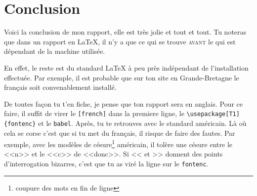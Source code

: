 \chapter{Conclusion}
\label{Conclusion}

Voici la conclusion de mon rapport, elle est tr\`es jolie et tout et tout. Tu noteras que dans un rapport en \LaTeX{}, il n'y a que ce qui se trouve \textsc{avant} le \verb"" qui est d\'ependant de la machine utilis\'ee.

En effet, le reste est du standard \LaTeX{} \`a peu pr\`es ind\'ependant de l'installation effectu\'ee. Par exemple, il est probable que sur ton site en
Grande-Bretagne le fran\c{c}ais soit convenablement install\'e.

De toutes fa\c{c}on tu t'en fiche, je pense que ton rapport sera en anglais. Pour ce faire, il suffit de virer le \verb"[french]" dans la premiere ligne,
le \verb"\usepackage[T1]{fontenc}" et le \verb"babel". Apr\`es, tu te retrouves avec le standard am\'ericain. L\`a o\`u cela se corse c'est que si tu met du
fran\c{c}ais, il risque de faire des fautes. Par exemple, avec les mod\`eles de c\'esure\footnote{coupure des mots en fin de ligne} am\'ericain, il tol\`ere
une c\'esure entre le <<n>> et le <<c>> de <<donc>>. Si << et >> donnent des points d'interrogation bizarres, c'est que tu as vir\'e la ligne sur le
\verb"fontenc".